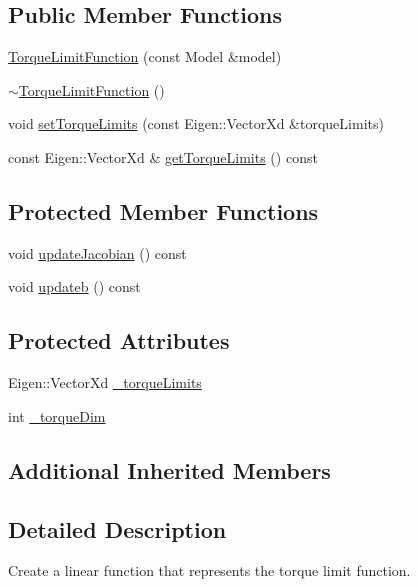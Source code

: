 \subsection*{Public Member Functions}
\begin{DoxyCompactItemize}
\item 
\hyperlink{classocra_1_1TorqueLimitFunction_a3ca04338256c4a0bf484f29dc7aeb06d}{Torque\+Limit\+Function} (const Model \&model)
\item 
\hyperlink{classocra_1_1TorqueLimitFunction_a810eb8dd094bb809859a6adf9c6c4a18}{$\sim$\+Torque\+Limit\+Function} ()
\item 
void \hyperlink{classocra_1_1TorqueLimitFunction_a038250b745913584724401ea719177a5}{set\+Torque\+Limits} (const Eigen\+::\+Vector\+Xd \&torque\+Limits)
\item 
const Eigen\+::\+Vector\+Xd \& \hyperlink{classocra_1_1TorqueLimitFunction_a455115a2dc26da5603bbf843bb88ef38}{get\+Torque\+Limits} () const
\end{DoxyCompactItemize}
\subsection*{Protected Member Functions}
\begin{DoxyCompactItemize}
\item 
void \hyperlink{classocra_1_1TorqueLimitFunction_ad33a9f6f6af6edd6b3c0cda6f915336b}{update\+Jacobian} () const
\item 
void \hyperlink{classocra_1_1TorqueLimitFunction_a157cb13ffdc53d3a7ed568b59154b0d0}{updateb} () const
\end{DoxyCompactItemize}
\subsection*{Protected Attributes}
\begin{DoxyCompactItemize}
\item 
Eigen\+::\+Vector\+Xd \hyperlink{classocra_1_1TorqueLimitFunction_a929154bb1273971f123d12ce810fd375}{\+\_\+torque\+Limits}
\item 
int \hyperlink{classocra_1_1TorqueLimitFunction_ae7eed81decd37aa8bb6baeb47c5fb4d0}{\+\_\+torque\+Dim}
\end{DoxyCompactItemize}
\subsection*{Additional Inherited Members}


\subsection{Detailed Description}
Create a linear function that represents the torque limit function. 

